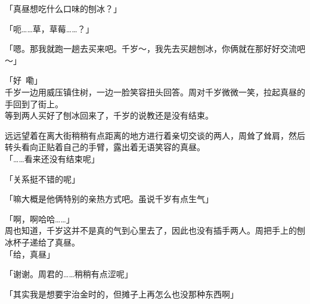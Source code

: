 「真昼想吃什么口味的刨冰？」

「呃……草，草莓……？」

「嗯。那我就跑一趟去买来吧。千岁～，我先去买趟刨冰，你俩就在那好好交流吧～」

「好~嘞」\\

千岁一边用威压镇住树，一边一脸笑容扭头回答。周对千岁微微一笑，拉起真昼的手回到了街上。\\



等到两人买好了刨冰回来了，千岁的说教还是没有结束。

远远望着在离大街稍稍有点距离的地方进行着亲切交谈的两人，周耸了耸肩，然后转头看向正贴着自己的手臂，露出着无语笑容的真昼。\\

「……看来还没有结束呢」

「关系挺不错的呢」

「嘛大概是他俩特别的亲热方式吧。虽说千岁有点生气」

「啊，啊哈哈……」\\

周也知道，千岁这并不是真的气到心里去了，因此也没有插手两人。周把手上的刨冰杯子递给了真昼。\\

「给，真昼」

「谢谢。周君的……稍稍有点涩呢」

「其实我是想要宇治金时的，但摊子上再怎么也没那种东西啊」\\

